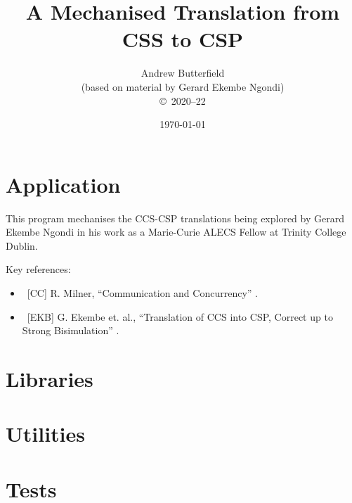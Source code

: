 \documentclass[fleqn,10pt]{report}
\author{
Andrew Butterfield
\\(based on material by Gerard Ekembe Ngondi)
\\
{\small \copyright\ 2020--22}
}
\title{
  A Mechanised Translation from CSS to CSP
}
\date{
\today
}
\begin{document}
\maketitle
\setcounter{tocdepth}{4}
\tableofcontents


\chapter{Application}

This program mechanises the CCS-CSP translations
being explored by Gerard Ekembe Ngondi
in his work as a Marie-Curie ALECS Fellow at Trinity College Dublin.

Key references:
\begin{itemize}
  \item ~[CC] R. Milner, ``Communication and Concurrency''
  \cite{Comm:Concur:Milner:89}.
  \item ~[EKB]  G. Ekembe et. al., ``Translation of CCS into CSP, Correct up to
Strong Bisimulation'' \cite{DBLP:conf/sefm/NgondiKB21}.
\end{itemize}

\newpage

\chapter{Libraries}

\newpage
\newpage
\newpage

\appendix

\chapter{Utilities}

\newpage


\chapter{Tests}

\newpage

% 



\end{document}
